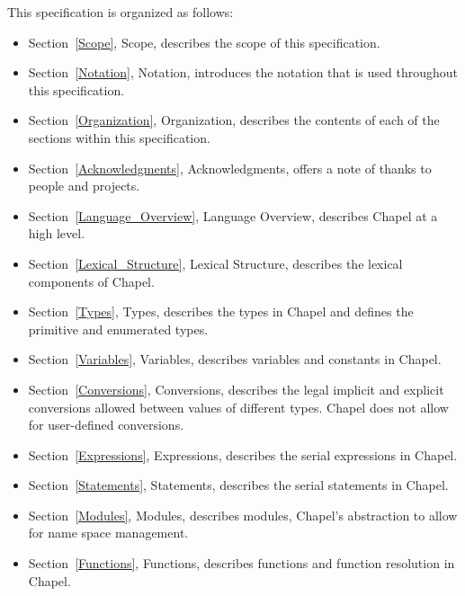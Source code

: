 \label{Organization}

This specification is organized as follows:
\begin{itemize}

\item
Section~\ref{Scope}, Scope, describes the scope of this specification.

\item
Section~\ref{Notation}, Notation, introduces the notation that is used
throughout this specification.

\item
Section~\ref{Organization}, Organization, describes the contents of
each of the sections within this specification.

\item
Section~\ref{Acknowledgments}, Acknowledgments, offers a note of
thanks to people and projects.

\item
Section~\ref{Language_Overview}, Language Overview, describes Chapel
at a high level.

\item
Section~\ref{Lexical_Structure}, Lexical Structure, describes the
lexical components of Chapel.

\item
Section~\ref{Types}, Types, describes the types in Chapel and defines
the primitive and enumerated types.

\item
Section~\ref{Variables}, Variables, describes variables and constants
in Chapel.

\item
Section~\ref{Conversions}, Conversions, describes the legal implicit
and explicit conversions allowed between values of different types.
Chapel does not allow for user-defined conversions.

\item
Section~\ref{Expressions}, Expressions, describes the serial
expressions in Chapel.

\item
Section~\ref{Statements}, Statements, describes the serial statements
in Chapel.

\item
Section~\ref{Modules}, Modules, describes modules, Chapel's
abstraction to allow for name space management.

\item
Section~\ref{Functions}, Functions, describes functions and function
resolution in Chapel.


\end{itemize}
